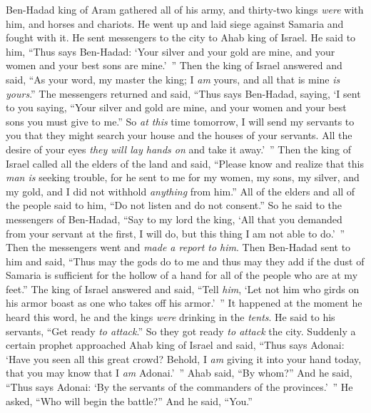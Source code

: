 \begin{biblechapter} %
 Ben-Hadad king of Aram gathered all of his army, and thirty-two kings \textit{were} with him, and horses and chariots. He went up and laid siege against Samaria and fought with it.
\verse He sent messengers to the city to Ahab king of Israel.
\verse He said to him, “Thus says Ben-Hadad: ‘Your silver and your gold are mine, and your women and your best sons are mine.’ ”
\verse Then the king of Israel answered and said, “As your word, my master the king; I \textit{am} yours, and all that is mine \textit{is yours}.”
\verse The messengers returned and said, “Thus says Ben-Hadad, saying, ‘I sent to you saying, “Your silver and gold are mine, and your women and your best sons you must give to me.”
\verse So \textit{at this} time tomorrow, I will send my servants to you that they might search your house and the houses of your servants. All the desire of your eyes \textit{they will lay hands on} and take it away.’ ”
\verse Then the king of Israel called all the elders of the land and said, “Please know and realize that this \textit{man is} seeking trouble, for he sent to me for my women, my sons, my silver, and my gold, and I did not withhold \textit{anything} from him.”
\verse All of the elders and all of the people said to him, “Do not listen and do not consent.”
\verse So he said to the messengers of Ben-Hadad, “Say to my lord the king, ‘All that you demanded from your servant at the first, I will do, but this thing I am not able to do.’ ” Then the messengers went and \textit{made a report to him}.
\verse Then Ben-Hadad sent to him and said, “Thus may the gods do to me and thus may they add if the dust of Samaria is sufficient for the hollow of a hand for all of the people who are at my feet.”
\verse The king of Israel answered and said, “Tell \textit{him}, ‘Let not him who girds on his armor boast as one who takes off his armor.’ ”
\verse It happened at the moment he heard this word, he and the kings \textit{were} drinking in the \textit{tents}. He said to his servants, “Get ready \textit{to attack}.” So they got ready \textit{to attack} the city.
\verse Suddenly a certain prophet approached Ahab king of Israel and said, “Thus says Adonai: ‘Have you seen all this great crowd? Behold, I \textit{am} giving it into your hand today, that you may know that I \textit{am} Adonai.’ ”
\verse Ahab said, “By whom?” And he said, “Thus says Adonai: ‘By the servants of the commanders of the provinces.’ ” He asked, “Who will begin the battle?” And he said, “You.”

\end{biblechapter}
